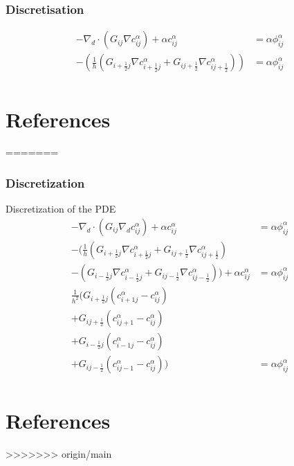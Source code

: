 \documentclass[11pt]{article}
\begin{document}
\subsubsection{Discretisation}
\label{sec:orgf2e3e35}

\begin{align*}
- \nabla_d \cdot  (G_{ij} \nabla c_{ij}^\alpha) + \alpha  c_{ij}^\alpha &= \alpha \phi_{ij}^\alpha \\
- (\frac{1}{h}(G_{i+\frac{1}{2}j} \nabla c^\alpha_{i+\frac{1}{2}j} + G_{ij+\frac{1}{2}} \nabla c^\alpha_{ij+\frac{1}{2}}))  &= \alpha  \phi_{ij}^\alpha \\
\end{align*}
\section{References}
\label{sec:orge455982}
=======
\subsubsection{Discretization}
\label{sec:org12de1ac}
Discretization of the PDE
\begin{align*}
- \nabla_d \cdot  (G_{ij} \nabla_d c_{ij}^\alpha) + \alpha  c_{ij}^\alpha &= \alpha \phi_{ij}^\alpha \\
- (\frac{1}{h}(G_{i+\frac{1}{2}j} \nabla c^\alpha_{i+\frac{1}{2}j} + G_{ij+\frac{1}{2}} \nabla c^\alpha_{ij+\frac{1}{2}}) &  \\
- (G_{i-\frac{1}{2}j} \nabla c^\alpha_{i-\frac{1}{2}j} + G_{ij-\frac{1}{2}} \nabla c^\alpha_{ij-\frac{1}{2}})) + \alpha  c_{ij}^\alpha   &= \alpha  \phi_{ij}^\alpha \\
\frac{1}{h^2} ( G_{i+\frac{1}{2}j}(c_{i+1j}^\alpha - c_{ij}^\alpha) & \\
+G_{ij+\frac{1}{2}}(c_{ij+1}^\alpha - c_{ij}^\alpha) &\\
+G_{i-\frac{1}{2}j}(c_{i-1j}^\alpha - c_{ij}^\alpha)&\\
+G_{ij-\frac{1}{2}}(c_{ij-1}^\alpha - c_{ij}^\alpha))&=\alpha  \phi_{ij}^\alpha \\
\end{align*}
\section{References}
\label{sec:orgfef094c}
>>>>>>> origin/main
\printbibliography
\end{document}
